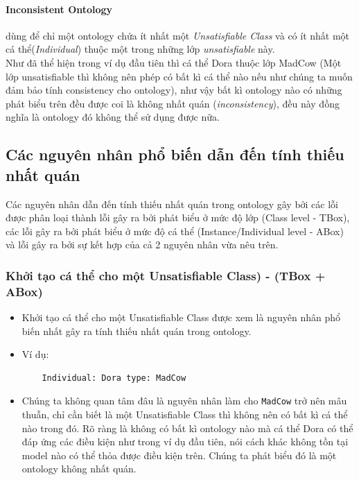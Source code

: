 \paragraph{Inconsistent Ontology} dùng để chỉ một ontology chứa ít nhất một \textit{Unsatisfiable Class} và có ít nhất một cá thể(\textit{Individual}) thuộc một trong những lớp \textit{unsatisfiable} này.
\\
\hspace{0.05\textwidth} Như đã thể hiện trong ví dụ đầu tiên thì cá thể Dora thuộc lớp MadCow (Một lớp unsatisfiable thì không nên phép có bất kì cá thể nào nếu như chúng ta muốn đảm bảo tính consistency cho ontology), như vậy bất kì ontology nào có những phát biểu trên đều được coi là không nhất quán (\textit{inconsistency}), đều này đồng nghĩa là ontology đó không thể sử dụng được nữa.

\subsection{Các nguyên nhân phổ biến dẫn đến tính thiếu nhất quán}
Các nguyên nhân dẫn đến tính thiếu nhất quán trong ontology gây bởi các lỗi được phân loại thành lỗi gây ra bởi phát biểu ở mức độ lớp (Class level - TBox), các lỗi gây ra bởi phát biểu ở mức độ cá thể (Instance/Individual level - ABox)\cite{inconsitentReason} và lỗi gây ra bởi sự kết hợp của cả 2 nguyên nhân vừa nêu trên.
\subsubsection{Khởi tạo cá thể cho một Unsatisfiable Class) - (TBox + ABox)}
\begin{itemize}
	\item
	Khởi tạo cá thể cho một Unsatisfiable Class được xem là nguyên nhân phổ biến nhất gây ra tính thiếu nhất quán trong ontology.
	\item
	Ví dụ:
	\begin{verbatim}
	Individual: Dora type: MadCow
	\end{verbatim}
	\item
	Chúng ta không quan tâm đâu là nguyên nhân làm cho \texttt{MadCow} trở nên mâu thuẫn, chỉ cần biết là một Unsatisfiable Class thì không nên có bất kì cá thể nào trong đó. Rõ ràng là không có bất kì ontology nào mà cá thể Dora có thể đáp ứng các điều kiện như trong ví dụ đầu tiên, nói cách khác không tồn tại model nào có thể thỏa được điều kiện trên. Chúng ta phát biểu đó là một ontology không nhất quán.
\end{itemize}
